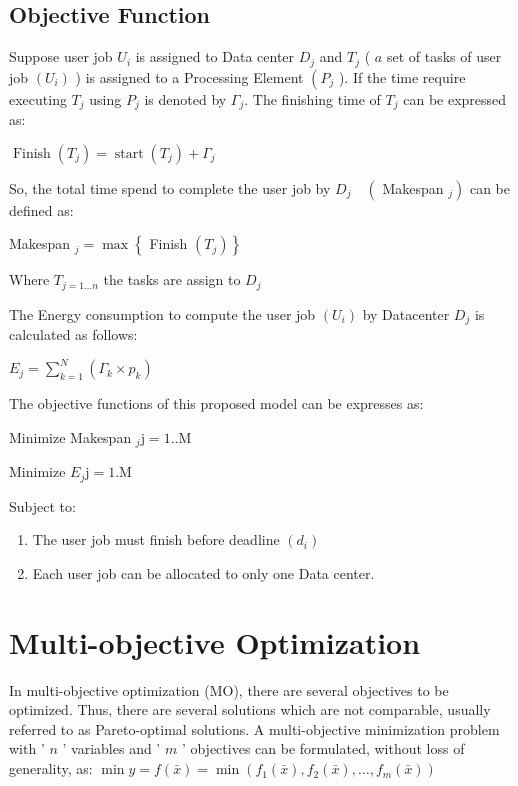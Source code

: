 \documentclass[10pt]{article}
\begin{document}
\subsection{Objective Function}
Suppose user job $U_{i}$ is assigned to Data center $D_{j}$ and $T_{j}$ ( $a$ set of tasks of user job $\left(U_{i}\right)$ ) is assigned to a Processing Element $\left(P_{j}\right.$ ). If the time require executing $T_{j}$ using $P_{j}$ is denoted by $\Gamma_{j}$. The finishing time of $T_{j}$ can be expressed as:

$\operatorname{Finish}\left(T_{j}\right)=\operatorname{start}\left(T_{j}\right)+\Gamma_{j}$

So, the total time spend to complete the user job by $D_{j} \quad\left(\right.$ Makespan $\left._{j}\right)$ can be defined as:

Makespan $_{j}=\max \left\{\right.$ Finish $\left.\left(T_{j}\right)\right\}$

Where $T_{j=1 \ldots n}$ the tasks are assign to $D_{j}$

The Energy consumption to compute the user job $\left(U_{i}\right)$ by Datacenter $D_{j}$ is calculated as follows:

$E_{j}=\sum_{k=1}^{N}\left(\Gamma_{k} \times p_{k}\right)$

The objective functions of this proposed model can be expresses as:

Minimize Makespan $_{j} \mathrm{j}=1 . . \mathrm{M}$

Minimize $E_{j} \mathrm{j}=1 . \mathrm{M}$

Subject to:

\begin{enumerate}
  \item The user job must finish before deadline $\left(d_{i}\right)$

  \item Each user job can be allocated to only one Data center.

\end{enumerate}

\section{Multi-objective Optimization}
In multi-objective optimization (MO), there are several objectives to be optimized. Thus, there are several solutions which are not comparable, usually referred to as Pareto-optimal solutions. A multi-objective minimization problem with ' $n$ ' variables and ' $m$ ' objectives can be formulated, without loss of generality, as: $\min y=f(\bar{x})=\min \left(f_{1}(\bar{x}), f_{2}(\bar{x}), \ldots, f_{m}(\bar{x})\right)$
\end{document}
